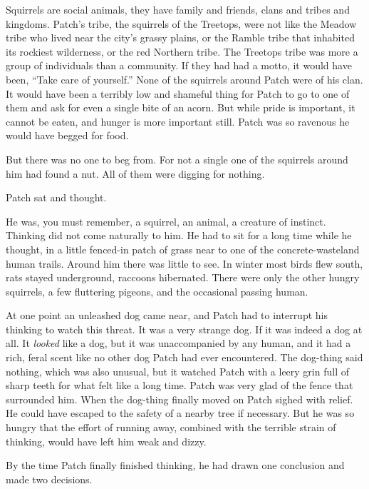 \documentclass[ebook,oneside,openany,17pt]{memoir}
\newenvironment{tolerant}[1]{%
  \par\tolerance=#1\relax
}{%
  \par
}
\begin{document}
Squirrels are social animals, they have family and friends, clans and
tribes and kingdoms. Patch’s tribe, the squirrels of the Treetops,
were not like the Meadow tribe who lived near the city’s grassy
plains, or the Ramble tribe that inhabited its rockiest wilderness, or
the red Northern tribe. The Treetops tribe was more a group of
individuals than a community. If they had had a motto, it would have
been, “Take care of yourself.” None of the squirrels around Patch were
of his clan. It would have been a terribly low and shameful thing for
Patch to go to one of them and ask for even a single bite of an
acorn. But while pride is important, it cannot be eaten, and hunger is
more important still. Patch was so ravenous he would have begged for
food.

But there was no one to beg from. For not a single one of the
squirrels around him had found a nut. All of them were digging for
nothing.

Patch sat and thought.

\begin{tolerant}{1500}
He was, you must remember, a squirrel, an animal, a creature of
instinct. Thinking did not come naturally to him. He had to sit for a
long time while he thought, in a little fenced-in patch of grass near
to one of the concrete-wasteland human trails. Around him there was
little to see. In winter most birds flew south, rats stayed
underground, raccoons hibernated. There were only the other hungry
squirrels, a few fluttering pigeons, and the occasional passing human.
\end{tolerant}

At one point an unleashed dog came near, and Patch had to interrupt
his thinking to watch this threat. It was a very strange dog. If it
was indeed a dog at all. It \emph{looked} like a dog, but it was
unaccompanied by any human, and it had a rich, feral scent like no
other dog Patch had ever encountered. The dog-thing said nothing,
which was also unusual, but it watched Patch with a leery grin full of
sharp teeth for what felt like a long time. Patch was very glad of the
fence that surrounded him. When the dog-thing finally moved on Patch
sighed with relief. He could have escaped to the safety of a nearby
tree if necessary. But he was so hungry that the effort of running
away, combined with the terrible strain of thinking, would have left
him weak and dizzy.

By the time Patch finally finished thinking, he had drawn one
conclusion and made two decisions.
\end{document}
